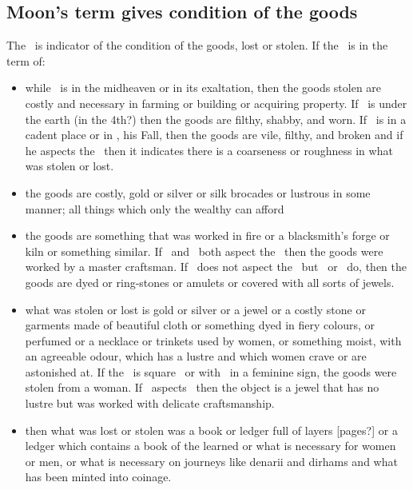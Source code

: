 \subsection{Moon's term gives condition of the goods}
The \Moon\, is indicator of the condition of the goods, lost or stolen. If the \Moon\, is in the term of:
\begin{itemize}[topsep=0em,itemsep=0em]
\item[\Saturn] while \Saturn\, is in the midheaven or in its exaltation, then the goods stolen are costly and necessary in farming or building or acquiring property. If \Saturn\, is under the earth (in the 4th?) then the goods are filthy, shabby, and worn. If \Saturn\, is in a cadent place or in \Aries, his Fall, then the goods are vile, filthy, and broken and if he aspects the \Moon\, then it indicates there is a coarseness or roughness in what was stolen or lost.
\item[\Jupiter] the goods are costly, gold or silver or silk brocades or lustrous in some manner; all things which only the wealthy can afford
\item[\Mars] the goods are something that was worked in fire or a blacksmith's forge or kiln or something similar. If \Mars\, and \Mercury\, both aspect the \Moon\, then the goods were worked by a master craftsman. If \Mars\, does not aspect the \Moon\, but \Venus\, or \Mercury\, do, then the goods are dyed or ring-stones or amulets or covered with all sorts of jewels.
\item[\Venus] what was stolen or lost is gold or silver or a jewel or a costly stone or garments made of beautiful cloth or something dyed in fiery colours, or perfumed or a necklace or trinkets used by women, or something moist, with an agreeable odour, which has a lustre and which women crave or are astonished at. If the \Moon\, is square \Venus\, or with \Venus\, in a feminine sign, the goods were stolen from a woman. If \Mars\, aspects \Venus\, then the object is a jewel that has no lustre but was worked with delicate craftsmanship.
\item[\Mercury] then what was lost or stolen was a book or ledger full of layers [pages?] or a ledger which contains a book of the learned or what is necessary for women or men, or what is necessary on journeys like denarii and dirhams and what has been minted into coinage.
\end{itemize}

